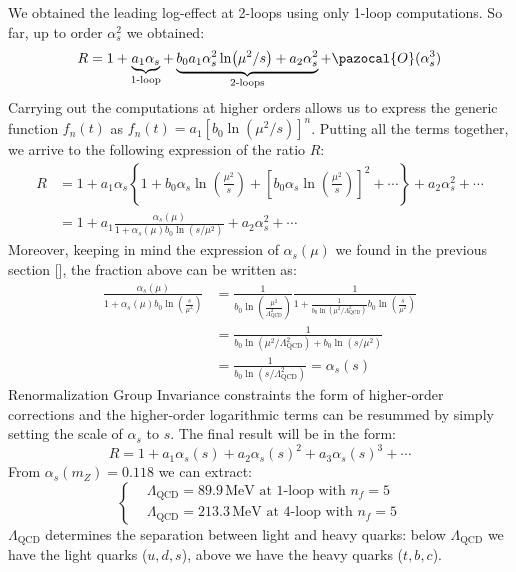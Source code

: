 \documentclass[../main.tex]{subfiles}
\begin{document}
We obtained the leading log-effect at 2-loops using only 1-loop computations. So far, up to order $\alpha_s^2$ we obtained:
\[
R=1+\underbrace{a_1\alpha_s}_{\text{1-loop}}+\underbrace{b_0a_1\alpha_s^2\ln(\mu^2/s)+a_2\alpha_s^2}_{\text{2-loops}}+\pazocal{O}(\alpha_s^3)
\]
Carrying out the computations at higher orders allows us to express the generic function $f_n(t)$ as $f_n(t)=a_1[b_0\ln(\mu^2/s)]^n$. Putting all the terms together, we arrive to the following expression of the ratio $R$:
\begin{align*}
R&=1+a_1\alpha_s\left\{1+b_0\alpha_s\ln\left(\frac{\mu^2}{s}\right)+\left[b_0\alpha_s\ln\left(\frac{\mu^2}{s}\right)\right]^2+\cdots\right\}+a_2\alpha_s^2+\cdots\\
&=1+a_1\frac{\alpha_s(\mu)}{1+\alpha_s(\mu)b_0\ln(s/\mu^2)}+a_2\alpha_s^2+\cdots
\end{align*}
Moreover, keeping in mind the expression of $\alpha_s(\mu)$ we found in the previous section [], the fraction above can be written as:
\begin{align*}
\frac{\alpha_s(\mu)}{1+\alpha_s(\mu)b_0\ln\left(\frac{s}{\mu^2}\right)}&=\frac{1}{b_0\ln\left(\frac{\mu^2}{\Lambda_{\text{QCD}}^2}\right)}\frac{1}{1+\frac{1}{b_0\ln(\mu^2/\Lambda_{\text{QCD}}^2)}b_0\ln\left(\frac{s}{\mu^2}\right)}\\
&=\frac{1}{b_0\ln(\mu^2/\Lambda_{\text{QCD}}^2)+b_0\ln(s/\mu^2)}\\
&=\frac{1}{b_0\ln(s/\Lambda_{\text{QCD}}^2)}=\alpha_s(s)
\end{align*}
Renormalization Group Invariance constraints the form of higher-order corrections and the higher-order logarithmic terms can be resummed by simply setting the scale of $\alpha_s$ to $s$. The final result will be in the form:
\[
R=1+a_1\alpha_s(s)+a_2\alpha_s(s)^2+a_3\alpha_s(s)^3+\cdots
\]
From $\alpha_s(m_Z)=0.118$ we can extract:
\[
\left\{
\begin{aligned}
&\Lambda_{\text{QCD}}=89.9\,\text{MeV at 1-loop with $n_f=5$}\\
&\Lambda_{\text{QCD}}=213.3\,\text{MeV at 4-loop with $n_f=5$}
\end{aligned}
\right.
\]
$\Lambda_{\text{QCD}}$ determines the separation between light and heavy quarks: below $\Lambda_{\text{QCD}}$ we have the light quarks ($u, d, s$), above we have the heavy quarks ($t, b, c$).
\end{document}
